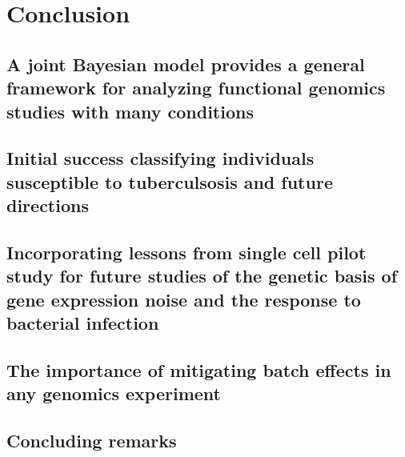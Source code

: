 \chapter{Conclusion}\label{conclusion}

\section{A joint Bayesian model provides a general framework for analyzing functional genomics studies with many conditions}



\section{Initial success classifying individuals susceptible to tuberculsosis and future directions}

\section{Incorporating lessons from single cell pilot study for future studies of the genetic basis of gene expression noise and the response to bacterial infection}


\section{The importance of mitigating batch effects in any genomics experiment}

\section{Concluding remarks}

